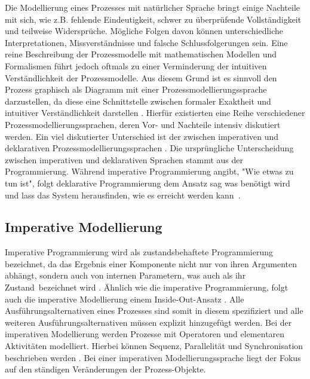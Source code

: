 Die Modellierung eines Prozesses mit natürlicher Sprache bringt einige Nachteile mit sich, wie z.B. fehlende Eindeutigkeit, schwer zu überprüfende Vollständigkeit und teilweise Widersprüche. Mögliche Folgen davon können unterschiedliche Interpretationen, Missverständnisse und falsche Schlussfolgerungen sein. Eine reine Beschreibung der Prozessmodelle mit mathematischen Modellen und Formalismen führt jedoch oftmals zu einer Verminderung der intuitiven Verständlichkeit der Prozessmodelle. Aus diesem Grund ist es sinnvoll den Prozess graphisch als Diagramm mit einer Prozessmodellierungssprache darzustellen, da diese eine Schnittstelle zwischen formaler Exaktheit und intuitiver Verständlichkeit darstellen \cite{thomas2009,kircher2006}.  \newline
Hierfür existierten eine Reihe verschiedener Prozessmodellierungssprachen, deren Vor- und Nachteile intensiv diskutiert werden. Ein viel diskutierter Unterschied ist der zwischen imperativen und deklarativen Prozessmodellierungssprachen \cite{fahland2009}. \newline
Die ursprüngliche Unterscheidung zwischen imperativen und deklarativen Sprachen stammt aus der Programmierung. Während imperative Programmierung angibt, "Wie etwas zu tun ist", folgt deklarative Programmierung dem Ansatz \grqq sag was benötigt wird und lass das System herausfinden, wie es erreicht werden kann\grqq \ \cite{pichler2012}.

\subsection{Imperative Modellierung}
Imperative Programmierung wird als zustandsbehaftete Programmierung bezeichnet, da das  Ergebnis einer Komponente nicht nur von ihren Argumenten abhängt, sondern auch von internen Parametern, was auch als ihr \grqq Zustand\grqq \  bezeichnet wird \cite{fahland2009}.  \newline
Ähnlich wie die imperative Programmierung, folgt auch die imperative Modellierung einem \grqq Inside-Out-Ansatz \grqq. Alle Ausführungsalternativen eines Prozesses sind somit in diesem spezifiziert und alle weiteren Ausführungsalternativen müssen explizit hinzugefügt werden. Bei der imperativen Modellierung werden Prozesse mit Operatoren und elementaren Aktivitäten modelliert. Hierbei können Sequenz, Parallelität und Synchronisation beschrieben werden \cite{kaschek1998}. Bei einer imperativen Modellierungssprache liegt der Fokus auf den ständigen Veränderungen der Prozess-Objekte.

